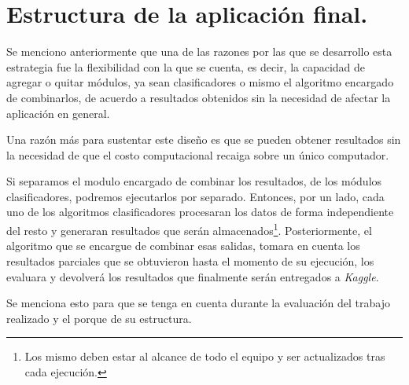 \chapter{Estructura de la aplicación final.}
Se menciono anteriormente que una de las razones por las que se desarrollo esta estrategia fue la flexibilidad con la que se cuenta, es decir, la capacidad de agregar o quitar módulos, ya sean clasificadores o mismo el algoritmo encargado de combinarlos, de acuerdo a resultados obtenidos sin la necesidad de afectar la aplicación en general. 

Una razón más para sustentar este diseño es que se pueden obtener resultados sin la necesidad de que el costo computacional recaiga sobre un único computador. 

Si separamos el modulo encargado de combinar los resultados, de los módulos clasificadores, podremos ejecutarlos por separado. Entonces, por un lado, cada uno de los algoritmos clasificadores procesaran los datos de forma independiente del resto y generaran resultados que serán almacenados\footnote{Los mismo deben estar al alcance de todo el equipo y ser actualizados tras cada ejecución.}. Posteriormente, el algoritmo que se encargue de combinar esas salidas, tomara en cuenta los resultados parciales que se obtuvieron hasta el momento de su ejecución, los evaluara y devolverá los resultados que finalmente serán entregados a \textit{Kaggle}.

Se menciona esto para que se tenga en cuenta durante la evaluación del trabajo realizado y el porque de su estructura.
